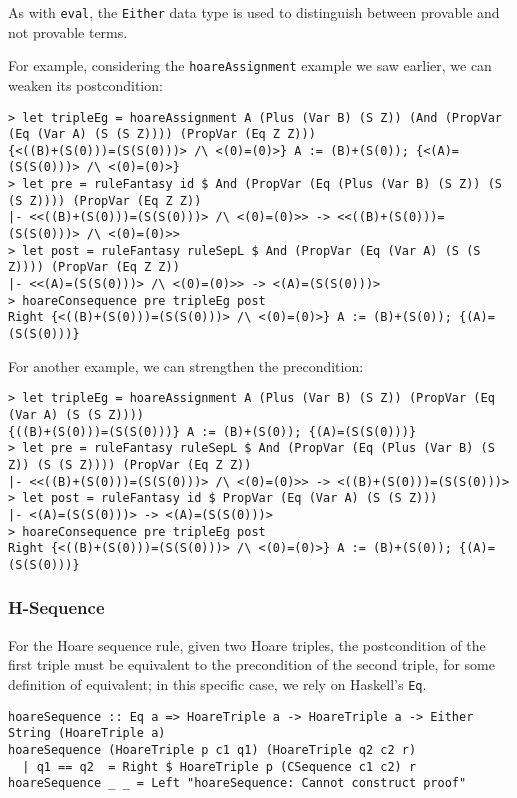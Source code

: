 \documentclass{article}
\begin{document}
As with \texttt{eval}, the \texttt{Either} data type is used to distinguish between provable and not provable terms.

For example, considering the \texttt{hoareAssignment} example we saw earlier, we can weaken its postcondition:

\begin{lstlisting}
> let tripleEg = hoareAssignment A (Plus (Var B) (S Z)) (And (PropVar (Eq (Var A) (S (S Z)))) (PropVar (Eq Z Z)))
{<((B)+(S(0)))=(S(S(0)))> /\ <(0)=(0)>} A := (B)+(S(0)); {<(A)=(S(S(0)))> /\ <(0)=(0)>}
> let pre = ruleFantasy id $ And (PropVar (Eq (Plus (Var B) (S Z)) (S (S Z)))) (PropVar (Eq Z Z))
|- <<((B)+(S(0)))=(S(S(0)))> /\ <(0)=(0)>> -> <<((B)+(S(0)))=(S(S(0)))> /\ <(0)=(0)>>
> let post = ruleFantasy ruleSepL $ And (PropVar (Eq (Var A) (S (S Z)))) (PropVar (Eq Z Z))
|- <<(A)=(S(S(0)))> /\ <(0)=(0)>> -> <(A)=(S(S(0)))>
> hoareConsequence pre tripleEg post
Right {<((B)+(S(0)))=(S(S(0)))> /\ <(0)=(0)>} A := (B)+(S(0)); {(A)=(S(S(0)))}
\end{lstlisting}

For another example, we can strengthen the precondition:

\begin{lstlisting}
> let tripleEg = hoareAssignment A (Plus (Var B) (S Z)) (PropVar (Eq (Var A) (S (S Z))))
{((B)+(S(0)))=(S(S(0)))} A := (B)+(S(0)); {(A)=(S(S(0)))}
> let pre = ruleFantasy ruleSepL $ And (PropVar (Eq (Plus (Var B) (S Z)) (S (S Z)))) (PropVar (Eq Z Z))
|- <<((B)+(S(0)))=(S(S(0)))> /\ <(0)=(0)>> -> <((B)+(S(0)))=(S(S(0)))>
> let post = ruleFantasy id $ PropVar (Eq (Var A) (S (S Z)))
|- <(A)=(S(S(0)))> -> <(A)=(S(S(0)))>
> hoareConsequence pre tripleEg post
Right {<((B)+(S(0)))=(S(S(0)))> /\ <(0)=(0)>} A := (B)+(S(0)); {(A)=(S(S(0)))}
\end{lstlisting}

\subsubsection{H-Sequence}

For the Hoare sequence rule, given two Hoare triples, the postcondition of the first triple must be equivalent to the precondition of the second triple, for some definition of equivalent; in this specific case, we rely on Haskell's \texttt{Eq}.

\begin{lstlisting}
hoareSequence :: Eq a => HoareTriple a -> HoareTriple a -> Either String (HoareTriple a)
hoareSequence (HoareTriple p c1 q1) (HoareTriple q2 c2 r)
  | q1 == q2  = Right $ HoareTriple p (CSequence c1 c2) r
hoareSequence _ _ = Left "hoareSequence: Cannot construct proof"
\end{lstlisting}
\end{document}
